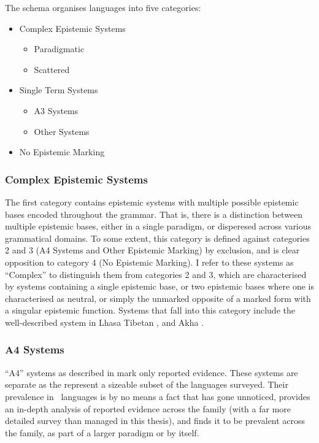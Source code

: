 The schema organises languages into five categories:
\begin{itemize}
    \item Complex Epistemic Systems
    \begin{itemize}
        \item Paradigmatic
        \item Scattered
    \end{itemize}
    \item Single Term Systems
    \begin{itemize}
        \item A3 Systems
        \item Other Systems
    \end{itemize}
    \item No Epistemic Marking
\end{itemize}
\subsubsection{Complex Epistemic Systems}
The first category contains epistemic systems with multiple possible epistemic bases encoded throughout the grammar. That is, there is a distinction between multiple epistemic bases, either in a single paradigm, or disperesed across various grammatical domains. To some extent, this category is defined against categories 2 and 3 (A4 Systems and Other Epistemic Marking) by exclusion, and is clear opposition to category 4 (No Epistemic Marking). I refer to these systems as ``Complex'' to distinguish them from categories 2 and 3, which are characterised by systems containing a single epistemic base, or two epistemic bases where one is characterised as neutral, or simply the unmarked opposite of a marked form with a singular epistemic function. Systems that fall into this category include the well-described system in Lhasa Tibetan \cite{DeLancey2017Tibetan}, and Akha \cite{Thurgood1986}.
\subsubsection{A4 Systems}
``A4'' systems as described in  mark only reported evidence. These systems are separate as the represent a sizeable subset of the languages surveyed. Their prevalence in \lfam\ languages is by no means a fact that has gone unnoticed,  provides an in-depth analysis of reported evidence across the family (with a far more detailed survey than managed in this thesis), and finds it to be prevalent across the family, as part of a larger paradigm or by itself.
